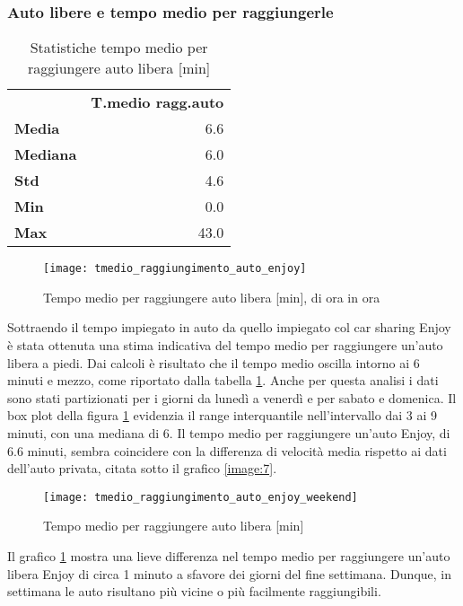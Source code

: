 \subsubsection{Auto libere e tempo medio per raggiungerle}

\begin{table}[H]
\centering
\begin{tabular}{ | l r | }
\hline
& \textbf{T.medio ragg.auto} \\
\textbf{Media}   &  6.6 \\
\textbf{Mediana} &  6.0 \\
\textbf{Std}     &  4.6 \\
\textbf{Min}     &  0.0 \\ 
\textbf{Max}     & 43.0 \\
\hline
\end{tabular}
\caption{Statistiche tempo medio per raggiungere auto libera [min]}
\label{table:4}
\end{table}

\begin{figure}[H]
	\texttt{[image: tmedio\_raggiungimento\_auto\_enjoy]}
	\caption{Tempo medio per raggiungere auto libera [min], di ora in ora}
	\label{image:8}
\end{figure}

Sottraendo il tempo impiegato in auto da quello impiegato col car sharing Enjoy è stata ottenuta una stima indicativa del tempo medio per raggiungere un'auto libera a piedi. Dai calcoli è risultato che il tempo medio oscilla intorno ai 6 minuti e mezzo, come riportato dalla tabella \ref{table:4}. Anche per questa analisi i dati sono stati partizionati per i giorni da lunedì a venerdì e per sabato e domenica. Il box plot della figura \ref{image:8} evidenzia il range interquantile nell'intervallo dai 3 ai 9 minuti, con una mediana di 6. Il tempo medio per raggiungere un'auto Enjoy, di 6.6 minuti, sembra coincidere con la differenza di velocità media rispetto ai dati dell'auto privata, citata sotto il grafico \ref{image:7}.

\begin{figure}[H]
	\texttt{[image: tmedio\_raggiungimento\_auto\_enjoy\_weekend]}
	\caption{Tempo medio per raggiungere auto libera [min]}
	\label{image:21}
\end{figure}

Il grafico \ref{image:8} mostra una lieve differenza nel tempo medio per raggiungere un'auto libera Enjoy di circa 1 minuto a sfavore dei giorni del fine settimana. Dunque, in settimana le auto risultano più vicine o più facilmente raggiungibili.


